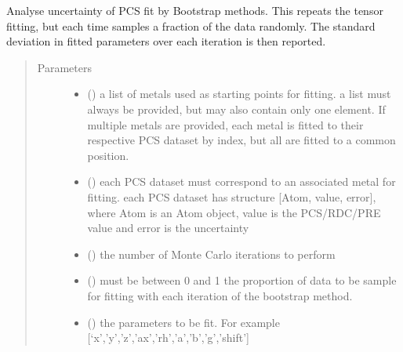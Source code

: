 \documentclass[a4paper,10pt,english]{sphinxmanual}
\begin{document}
\begin{fulllineitems}
\label{\detokenize{reference/generated/paramagpy.fit.pcs_fit_error_bootstrap:paramagpy.fit.pcs_fit_error_bootstrap}}
Analyse uncertainty of PCS fit by Bootstrap methods.
This repeats the tensor fitting, but each time samples a fraction
of the data randomly. The standard deviation in fitted parameters
over each iteration is then reported.
\begin{quote}\begin{description}
\item[{Parameters}] \leavevmode\begin{itemize}
\item {} 
 () \textendash{} a list of metals used as starting points for fitting.
a list must always be provided, but may also contain
only one element. If multiple metals are provided, each metal
is fitted to their respective PCS dataset by index, but all are
fitted to a common position.

\item {} 
 () \textendash{} each PCS dataset must correspond to an associated metal for fitting.
each PCS dataset has structure {[}Atom, value, error{]}, where Atom is
an Atom object, value is the PCS/RDC/PRE value
and error is the uncertainty

\item {} 
 () \textendash{} the number of Monte Carlo iterations to perform

\item {} 
 () \textendash{} must be between 0 and 1
the proportion of data to be sample for fitting with each iteration
of the bootstrap method.

\item {} 
 () \textendash{} the parameters to be fit.
For example {[}‘x’,’y’,’z’,’ax’,’rh’,’a’,’b’,’g’,’shift’{]}


\end{itemize}
\end{description}
\end{quote}
\end{fulllineitems}
\end{document}
